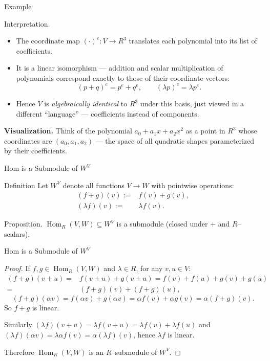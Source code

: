 \documentclass[11pt,aspectratio=43,ignorenonframetext,t]{beamer}
\begin{document}
\begin{frame}{Example}
\vspace{-0.3cm}
\begin{block}{Interpretation.}
\begin{itemize}
  \item The coordinate map $(\cdot)^e : V \to R^3$ translates each polynomial into its list of coefficients.  
  \item It is a linear isomorphism — addition and scalar multiplication of polynomials correspond exactly to those of their coordinate vectors:
  \[
  (p+q)^e = p^e + q^e, \qquad (\lambda p)^e = \lambda p^e.
  \]
  \item Hence $V$ is \emph{algebraically identical} to $R^3$ under this basis, just viewed in a different “language” — coefficients instead of components.
\end{itemize}

\textbf{Visualization.}  
Think of the polynomial $a_0+a_1x+a_2x^2$ as a point in $R^3$ whose coordinates are $(a_0,a_1,a_2)$ — the space of all quadratic shapes parameterized by their coefficients.    
\end{block}

\end{frame}


\begin{frame}{Hom is a Submodule of $W^V$}
\begin{block}{Definition}
    Let $W^V$ denote all functions $V\to W$ with pointwise operations:
\begin{align*}
(f+g)(v):=&f(v)+g(v),\\ (\lambda f)(v):=&\lambda f(v).    
\end{align*}
\end{block}
\begin{block}{Proposition.} $\operatorname{Hom}_R(V,W)\subseteq W^V$ is a submodule (closed under $+$ and $R$–scalars).
\end{block}

\end{frame}

\begin{frame}{Hom is a Submodule of $W^V$}
\begin{proof}
If $f,g\in\operatorname{Hom}_R(V,W)$ and $\lambda\in R$, for any $v,u\in V$:
\begin{align*}
(f+g)(v+u)=&f(v+u)+g(v+u)=f(v)+f(u)+g(v)+g(u)\\
=&(f+g)(v)+(f+g)(u),
\end{align*}
\[
(f+g)(\alpha v)=f(\alpha v)+g(\alpha v)=\alpha f(v)+\alpha g(v)=\alpha (f+g)(v).
\]
So $f+g$ is linear. 

Similarly $(\lambda f)(v+u)=\lambda f(v+u)=\lambda f(v)+\lambda f(u)$ and $(\lambda f)(\alpha v)=\lambda \alpha f(v) = \alpha(\lambda f)(v)$, hence $\lambda f$ is linear.

Therefore $\operatorname{Hom}_R(V,W)$ is an $R$–submodule of $W^V$.
\end{proof}
\end{frame}
\end{document}
